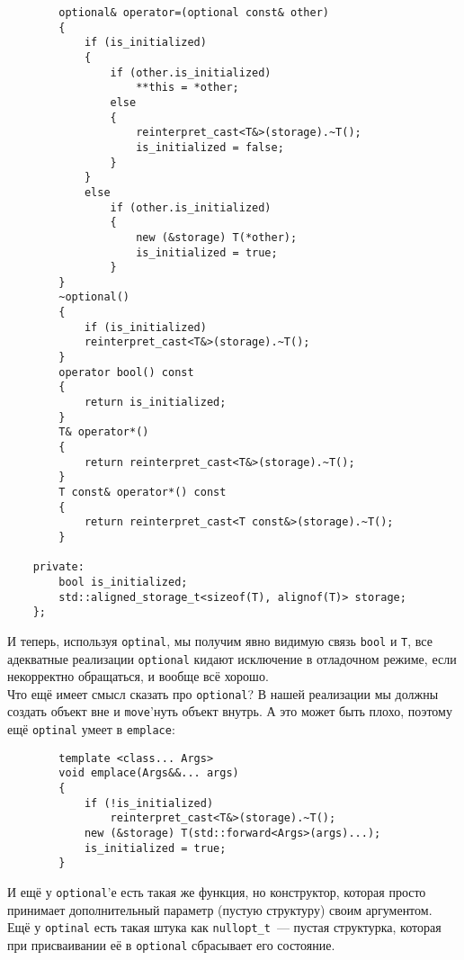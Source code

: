 \documentclass{article}
\begin{document}
    \begin{verbatim}
        optional& operator=(optional const& other)
        {
            if (is_initialized)
            {
                if (other.is_initialized)
                    **this = *other;
                else
                {
                    reinterpret_cast<T&>(storage).~T();
                    is_initialized = false;
                }
            }
            else
                if (other.is_initialized)
                {
                    new (&storage) T(*other);
                    is_initialized = true;
                }
        }
        ~optional()
        {
            if (is_initialized)
            reinterpret_cast<T&>(storage).~T();
        }
        operator bool() const
        {
            return is_initialized;
        }
        T& operator*()
        {
            return reinterpret_cast<T&>(storage).~T();
        }
        T const& operator*() const
        {
            return reinterpret_cast<T const&>(storage).~T();
        }

    private:
        bool is_initialized;
        std::aligned_storage_t<sizeof(T), alignof(T)> storage;
    };
    \end{verbatim}
    И теперь, используя \texttt{optinal}, мы получим явно видимую связь \texttt{bool} и \texttt{T}, все адекватные реализации \texttt{optional} кидают исключение в отладочном режиме, если некорректно обращаться, и вообще всё хорошо.\\
    Что ещё имеет смысл сказать про \texttt{optional}? В нашей реализации мы должны создать объект вне и \texttt{move}'нуть объект внутрь. А это может быть плохо, поэтому ещё \texttt{optinal} умеет в \texttt{emplace}:
    \begin{verbatim}
        template <class... Args>
        void emplace(Args&&... args)
        {
            if (!is_initialized)
                reinterpret_cast<T&>(storage).~T();
            new (&storage) T(std::forward<Args>(args)...);
            is_initialized = true;
        }
    \end{verbatim}
    И ещё у \texttt{optional}'е есть такая же функция, но конструктор, которая просто принимает дополнительный параметр (пустую структуру) своим аргументом.\\
    Ещё у \texttt{optinal} есть такая штука как \texttt{nullopt_t}~--- пустая структурка, которая при присваивании её в \texttt{optional} сбрасывает его состояние.\\
\end{document}
